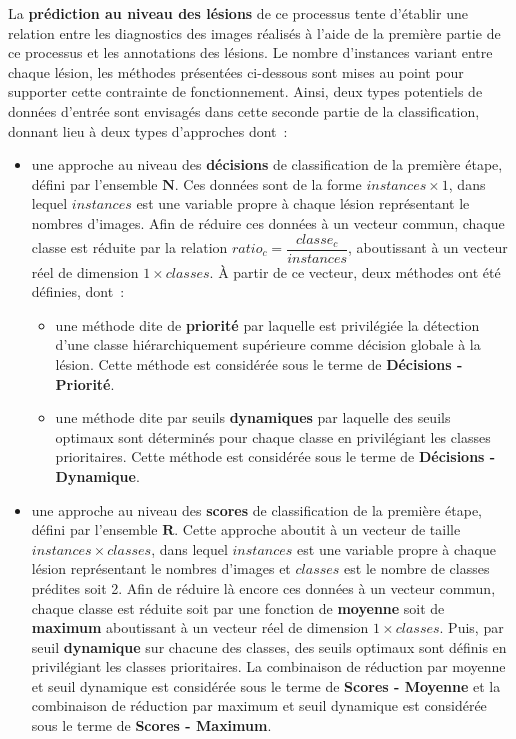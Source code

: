 La \textbf{prédiction au niveau des lésions} de ce processus tente d'établir une relation entre les diagnostics des images réalisés à l'aide de la première partie de ce processus et les annotations des lésions. Le nombre d'instances variant entre chaque lésion, les méthodes présentées ci-dessous sont mises au point pour supporter cette contrainte de fonctionnement. Ainsi, deux types potentiels de données d'entrée sont envisagés dans cette seconde partie de la classification, donnant lieu à deux types d'approches dont~:
\begin{itemize}
    \item   une approche au niveau des \textbf{décisions} de classification de la première étape, défini par l'ensemble $\mathbf{N}$. Ces données sont de la forme $instances \times 1$, dans lequel $instances$ est une variable propre à chaque lésion représentant le nombres d'images. Afin de réduire ces données à un vecteur commun, chaque classe est réduite par la relation $ratio_c = \dfrac{classe_c}{instances}$, aboutissant à un vecteur réel de dimension $1 \times classes$. À partir de ce vecteur, deux méthodes ont été définies, dont~:
            \begin{itemize}
                \item une méthode dite de \textbf{priorité} par laquelle est privilégiée la détection d'une classe hiérarchiquement supérieure comme décision globale à la lésion. Cette méthode est considérée sous le terme de \textbf{Décisions - Priorité}.
                \item une méthode dite par seuils \textbf{dynamiques} par laquelle des seuils optimaux sont déterminés pour chaque classe en privilégiant les classes prioritaires. Cette méthode est considérée sous le terme de \textbf{Décisions - Dynamique}.
            \end{itemize}
    \item   une approche au niveau des \textbf{scores} de classification de la première étape, défini par l'ensemble $\mathbf{R}$. Cette approche aboutit à un vecteur de taille $instances \times classes$, dans lequel $instances$ est une variable propre à chaque lésion représentant le nombres d'images et $classes$ est le nombre de classes prédites soit 2. Afin de réduire là encore ces données à un vecteur commun, chaque classe est réduite soit par une fonction de \textbf{moyenne} soit de \textbf{maximum} aboutissant à un vecteur réel de dimension $1 \times classes$. Puis, par seuil \textbf{dynamique} sur chacune des classes, des seuils optimaux sont définis en privilégiant les classes prioritaires. La combinaison de réduction par moyenne et seuil dynamique est considérée sous le terme de \textbf{Scores - Moyenne} et la combinaison de réduction par maximum et seuil dynamique est considérée sous le terme de  \textbf{Scores - Maximum}.
\end{itemize}\par
\clearpage

